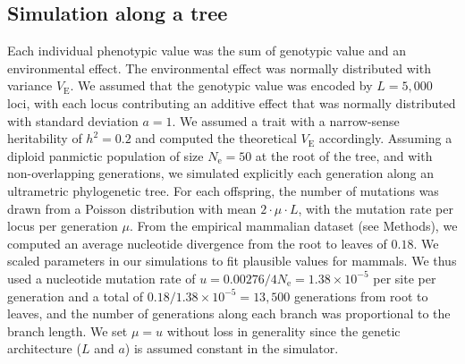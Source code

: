 \documentclass{article}
\newcommand{\Multiply}{\cdot}
\newcommand{\Ne}{N_{\text{e}}}
\newcommand{\Heritability}{h^2}
\newcommand{\MutationRatePheno}{\mu}
\newcommand{\MutationRateNuc}{u}
\newcommand{\NbrLoci}{L}
\newcommand{\VarEnv}{V_{\mathrm{E}}}
\begin{document}
\subsection{Simulation along a tree}\label{subsec:simulation-along-a-tree}
Each individual phenotypic value was the sum of genotypic value and an environmental effect.
The environmental effect was normally distributed with variance $\VarEnv$.
We assumed that the genotypic value was encoded by $\NbrLoci=5,000$ loci, with each locus contributing an additive effect that was normally distributed with standard deviation $a=1$.
We assumed a trait with a narrow-sense heritability of $\Heritability=0.2$ and computed the theoretical $\VarEnv$ accordingly.
Assuming a diploid panmictic population of size $\Ne=50$ at the root of the tree, and with non-overlapping generations, we simulated explicitly each generation along an ultrametric phylogenetic tree.
For each offspring, the number of mutations was drawn from a Poisson distribution with mean $2 \Multiply \MutationRatePheno \Multiply \NbrLoci $, with the mutation rate per locus per generation $\MutationRatePheno$.
From the empirical mammalian dataset (see Methods), we computed an average nucleotide divergence from the root to leaves of $0.18$.
We scaled parameters in our simulations to fit plausible values for mammals.
We thus used a nucleotide mutation rate of $\MutationRateNuc=0.00276 / 4 \Ne = 1.38 \times 10^{-5}$ per site per generation and a total of $0.18 / 1.38 \times 10^{-5} = 13,500$ generations from root to leaves, and the number of generations along each branch was proportional to the branch length.
We set $\MutationRatePheno=\MutationRateNuc$ without loss in generality since the genetic architecture ($\NbrLoci$ and $a$) is assumed constant in the simulator.
\end{document}
